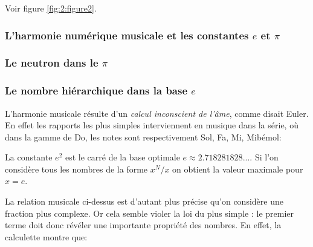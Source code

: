 \documentclass[a4paper,12pt]{article}
\begin{document}
Voir figure \ref{fig:2:figure2}.






\subsubsection{L'harmonie numérique musicale et les constantes $e$ et $\pi$}

\subsubsection{Le neutron dans le $\pi$}

\subsubsection{Le nombre hiérarchique dans la base $e$}


L'harmonie musicale résulte d'un \textit{calcul inconscient de l'âme}, comme disait Euler. En effet les rapports les plus simples interviennent en musique dans la série, où dans la gamme de Do, les notes sont respectivement Sol, Fa, Mi, Mibémol:




La constante $e^2$ est le carré de la base optimale $e \approx 2.718281828... $. Si l'on considère tous les nombres de la forme $x^N/x$ on obtient la valeur maximale pour $x = e$.


La relation musicale ci-dessus est d'autant plus précise qu'on considère une fraction plus complexe. Or cela semble violer la loi du plus simple : le premier terme doit donc révéler une importante propriété des nombres. En effet, la calculette montre que:
\end{document}
